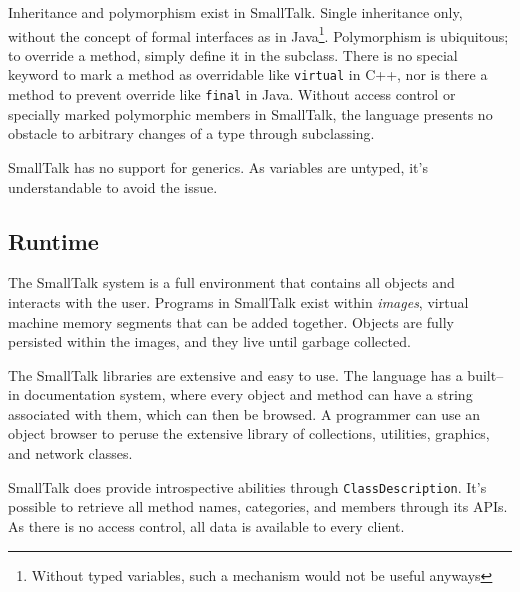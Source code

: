 	Inheritance and polymorphism exist in SmallTalk.  Single inheritance only\cite{802792}, without the concept of formal interfaces as in Java\footnote{Without typed variables, such a mechanism would not be useful anyways}.  Polymorphism is ubiquitous; to override a method, simply define it in the subclass.  There is no special keyword to mark a method as overridable like \texttt{virtual} in C++, nor is there a method to prevent override like \texttt{final} in Java.  Without access control or specially marked polymorphic members in SmallTalk, the language presents no obstacle to arbitrary changes of a type through subclassing.

	

	SmallTalk has no support for generics.  As variables are untyped, it's understandable to avoid the issue.
	
	

\subsection{Runtime}

	The SmallTalk system is a full environment that contains all objects and interacts with the user.  Programs in SmallTalk exist within \emph{images}, virtual machine memory segments that can be added together.  Objects are fully persisted within the images, and they live until garbage collected.

	The SmallTalk libraries are extensive and easy to use.  The language has a built--in documentation system, where every object and method can have a string associated with them, which can then be browsed.  A programmer can use an object browser to peruse the extensive library of collections, utilities, graphics, and network classes.

	SmallTalk does provide introspective abilities through \texttt{ClassDescription}.  It's possible to retrieve all method names, categories, and members through its APIs.  As there is no access control, all data is available to every client.

